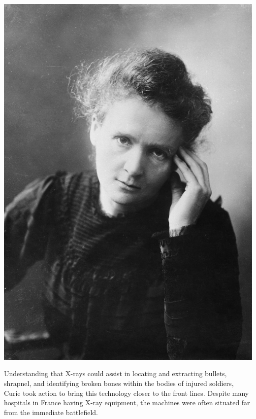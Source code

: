 \documentclass[a4paper,12pt]{report}
\begin{document}
\begin{center}
  \includegraphics[scale = 0.2]{curie.jpg}
  \label{curie}
\end{center}

Understanding that X-rays could assist in locating and extracting bullets, shrapnel, and
identifying broken bones within the bodies of injured soldiers, Curie took action to bring this
technology closer to the front lines. Despite many hospitals in France having X-ray equipment,
the machines were often situated far from the immediate battlefield.
\end{document}

